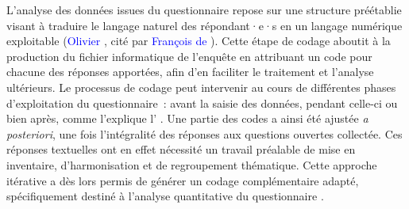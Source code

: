 \begin{refsegment}
L’analyse des données issues du questionnaire repose sur une structure préétablie visant à traduire le langage naturel des répondant·e·s en un langage numérique exploitable (\textcolor{blue}{Olivier} \textcolor{blue}{\textcite[49-62]{martin_analyse_2020}}, cité par \textcolor{blue}{François de} \textcolor{blue}{\textcite[89]{singly_questionnaire_2016}}). Cette étape de codage aboutit à la production du fichier informatique de l’enquête en attribuant un code pour chacune des réponses apportées, afin d’en faciliter le traitement et l’analyse ultérieurs. Le processus de codage peut intervenir au cours de différentes phases d'exploitation du questionnaire~: avant la saisie des données, pendant celle-ci ou bien après, comme l'explique l' \textcolor{blue}{\textcite{ined_saisie_nodate}}. Une partie des codes a ainsi été ajustée \textsl{a posteriori}, une fois l’intégralité des réponses aux questions ouvertes collectée. Ces réponses textuelles ont en effet nécessité un travail préalable de mise en inventaire, d’harmonisation et de regroupement thématique. Cette approche itérative a dès lors permis de générer un codage complémentaire adapté, spécifiquement destiné à l’analyse quantitative du questionnaire \textcolor{blue}{\autocite[89]{singly_questionnaire_2016}}.%


\end{refsegment}
